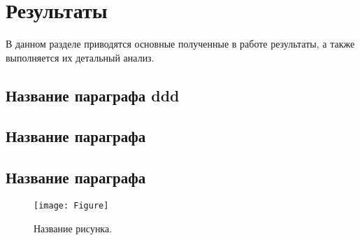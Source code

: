 \section{Результаты}
\label{sec:Results}

В данном разделе приводятся основные полученные в работе результаты, а также выполняется их детальный анализ.

\subsection{Название параграфа ddd}
\label{sec:}


\subsection{Название параграфа}
\label{sec:}




\subsection{Название параграфа}
\label{sec:}

\begin{figure*}[!h]
\centering
\texttt{[image: Figure]}
\caption{Название рисунка.}
\label{fig:}
\end{figure*}
